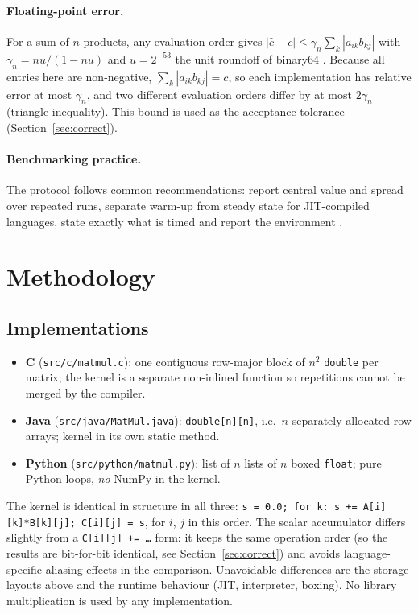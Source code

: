 \paragraph{Floating-point error.} For a sum of $n$ products, any evaluation order gives
$|\hat c-c|\le\gamma_n\sum_k|a_{ik}b_{kj}|$ with $\gamma_n=nu/(1-nu)$ and $u=2^{-53}$ the unit roundoff of binary64 \cite{higham,goldberg}. Because all
entries here are non-negative, $\sum_k|a_{ik}b_{kj}|=c$, so each implementation has relative error at most
$\gamma_n$, and two different evaluation orders differ by at most $2\gamma_n$ (triangle inequality). This bound is used as the
acceptance tolerance (Section~\ref{sec:correct}).

\paragraph{Benchmarking practice.} The protocol follows common recommendations: report central value and spread
over repeated runs, separate warm-up from steady state for JIT-compiled languages, state exactly what is timed
and report the environment \cite{georges,hoefler}.

\section{Methodology}

\subsection{Implementations}
\label{sec:impl}
\begin{itemize}
  \item \textbf{C} (\texttt{src/c/matmul.c}): one contiguous row-major block of $n^2$ \texttt{double} per matrix; the
        kernel is a separate non-inlined function so repetitions cannot be merged by the compiler.
  \item \textbf{Java} (\texttt{src/java/MatMul.java}): \texttt{double[n][n]}, i.e.\ $n$ separately allocated row
        arrays; kernel in its own static method.
  \item \textbf{Python} (\texttt{src/python/matmul.py}): list of $n$ lists of $n$ boxed \texttt{float}; pure Python
        loops, \emph{no} NumPy in the kernel.
\end{itemize}
The kernel is identical in structure in all three:
\texttt{s = 0.0; for k: s += A[i][k]*B[k][j]; C[i][j] = s}, for $i$, $j$ in this order. The scalar accumulator
differs slightly from a \texttt{C[i][j] += \dots} form: it keeps the same operation order (so the results are
bit-for-bit identical, see Section~\ref{sec:correct}) and avoids language-specific aliasing effects in the
comparison. Unavoidable differences are the storage layouts above and the runtime behaviour (JIT, interpreter,
boxing). No library multiplication is used by any implementation.

